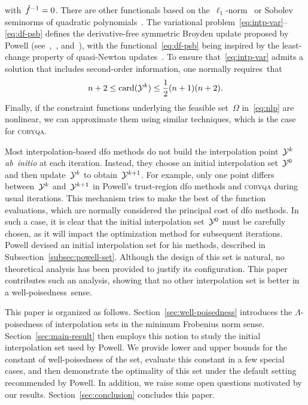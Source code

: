 \documentclass{article}
\numberwithin{equation}{section}
\theoremstyle{definition}
\theoremstyle{plain}
\theoremstyle{remark}
\DeclareMathOperator{\card}{card}
\newcommand*{\fset}{\Omega}
\newcommand*{\obj}{f}
\newcommand*{\objm}[1][]{\hat{\obj}\ifblank{#1}{}{^{#1}}}
\newcommand*{\solvername}[1]{\textsc{#1}\xspace}
\newcommand*{\xpt}[1][]{\mathcal{Y}\ifblank{#1}{}{^{#1}}}
\begin{document}
with~$\objm[-1] = 0$.
There are other functionals based on the~$\ell_1$-norm~\cite{Bandeira_Scheinberg_Vicente_2012} or Sobolev seminorms of quadratic polynomials~\cite{Zhang_2014,Xie_Yuan_2022}.
The variational problem~\eqref{eq:intp-var}--\eqref{eq:df-psb} defines the derivative-free symmetric
Broyden update proposed by Powell (see~\cite{Powell_2004a,Powell_2013},~\cite[\S~3.6]{Zhang_2012},
and~\cite[\S~2.4.2]{Ragonneau_2022}),
with the functional~\eqref{eq:df-psb} being inspired by the least-change property of quasi-Newton updates~\cite{Dennis_Schnabel_1979}.
To ensure that~\eqref{eq:intp-var} admits a solution that includes second-order information, one normally requires~that
\begin{equation*}
    n + 2 \le \card(\xpt[k]) \le \frac{1}{2} (n + 1) (n + 2).
\end{equation*}
Finally, if the constraint functions underlying the feasible set~$\fset$ in~\eqref{eq:nlp} are nonlinear, we can approximate them using similar techniques, which is the case for \solvername{cobyqa}.

Most interpolation-based \gls{dfo} methods do not build the interpolation point~$\xpt[k]$ \emph{ab~initio} at each iteration.
Instead, they choose an initial interpolation set~$\xpt[0]$ and then  update~$\xpt[k]$ to obtain~$\xpt[k + 1]$.
For example, only one point differs between~$\xpt[k]$ and~$\xpt[k + 1]$ in Powell's trust-region \gls{dfo} methods and \solvername{cobyqa} during usual iterations.
This mechanism tries to make the best of the function evaluations, which are normally considered the principal cost of \gls{dfo} methods.
In such a case, it is clear that the initial interpolation set~$\xpt[0]$ must be carefully chosen, as it will impact the optimization method for subsequent iterations.
Powell devised an initial interpolation set for his methods, described in Subsection~\ref{subsec:powell-set}.
Although the design of this set is natural, no theoretical analysis has been provided to justify its configuration.
This paper contributes such an analysis, showing that no other interpolation set is better in
a well-poisedness~sense.

This paper is organized as follows.
Section~\ref{sec:well-poisedness} introduces the $\Lambda$-poisedness of interpolation sets in the minimum Frobenius norm sense.
Section~\ref{sec:main-result} then employs this notion to study the initial interpolation set used by Powell.
We provide lower and upper bounds for the constant of well-poisedness of the set,
evaluate this constant in a few special cases,
and then demonstrate the optimality of this set under the default setting recommended by Powell.
In addition, we raise some open questions motivated by our results.
Section~\ref{sec:conclusion} concludes this paper.
\end{document}
